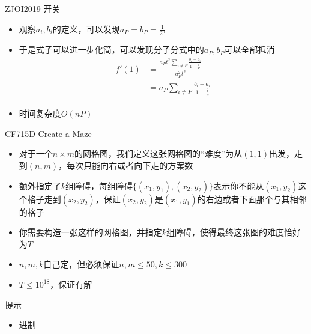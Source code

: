 \documentclass{beamer}
\begin{document}
\begin{frame}{ZJOI2019 开关}
    \begin{itemize}
        \item 观察$a_i, b_i$的定义，可以发现$a_P = b_P = \frac{1}{2^n}$
        \item 于是式子可以进一步化简，可以发现分子分式中的$a_P, b_P$可以全部抵消
        $$\begin{aligned}
            f'(1) &= \frac{a_Pt^2\sum_{i\neq P}\frac{b_i - a_i}{1 - \frac{i}{P}}}{a_P^2t^2}\\
            &= a_P\sum_{i\neq P}\frac{b_i - a_i}{1 - \frac ip}
        \end{aligned}$$
        \item 时间复杂度$O(nP)$
    \end{itemize}
\end{frame}

\begin{frame}{CF715D Create a Maze}
    \begin{itemize}
        \item 对于一个$n\times m$的网格图，我们定义这张网格图的“难度”为从$(1, 1)$出发，走到$(n, m)$，每次只能向右或者向下走的方案数
        \item 额外指定了$k$组障碍，每组障碍$\{(x_1, y_1),(x_2, y_2)\}$表示你不能从$(x_1, y_2)$这个格子走到$(x_2, y_2)$，保证$(x_2, y_2)$是$(x_1, y_1)$的右边或者下面那个与其相邻的格子
        \item 你需要构造一张这样的网格图，并指定$k$组障碍，使得最终这张图的难度恰好为$T$
        \item $n, m, k$自己定，但必须保证$n, m\leq 50, k\leq 300$
        \item $T\leq 10^{18}$，保证有解
    \end{itemize}
\end{frame}

\begin{frame}{提示}
    \begin{itemize}
        \item 进制
    \end{itemize}
\end{frame}
\end{document}
